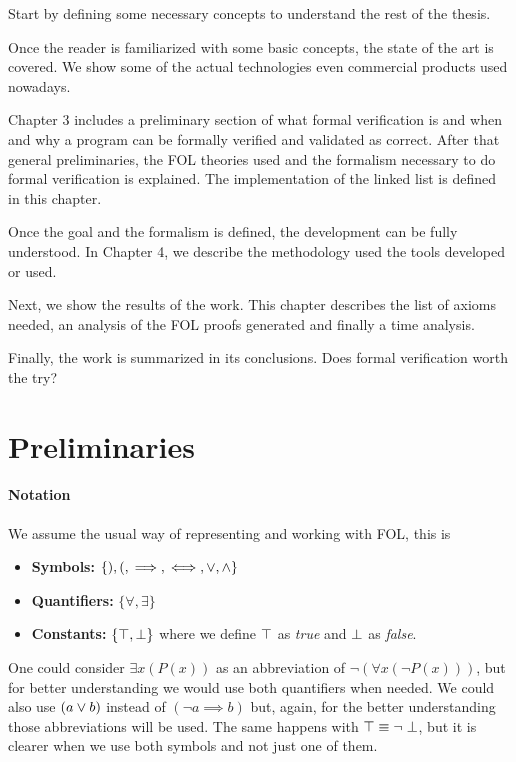 Start by defining some necessary concepts to understand the rest of the thesis.

Once the reader is familiarized with some basic concepts, the state of the art is covered. 
%
We show some of the actual technologies even commercial products used nowadays. 



Chapter 3 includes a preliminary section of what formal verification is and when and why a program can be formally verified and validated as correct. 
% 
After that general preliminaries, the \gls{FOL} theories used and the formalism necessary to do formal verification is explained.
%
The implementation of the linked list is defined in this chapter.

Once the goal and the formalism is defined, the development can be fully understood. 
%
In Chapter 4, we describe the methodology used the tools developed or used.

Next, we show the results of the work. 
%
This chapter describes the list of axioms needed, an analysis of the \gls{FOL} proofs generated and finally a time analysis.

Finally, the work is summarized in its conclusions. 
%
Does formal verification worth the try? 


\section{Preliminaries}


\paragraph{Notation}
\label{def:notation}
We assume the usual way of representing and working with \gls{FOL}, this is
\begin{itemize}
	\item \textbf{Symbols:} $\{),(, \implies, \iff, \vee , \wedge \}$
	\item \textbf{Quantifiers:} $\{\forall, \exists\}$
	\item \textbf{Constants:} $\{\top,\perp\}$
	where we define $\top$ as \textit{true} and $\perp$ as \textit{false}.
\end{itemize}

One could consider $\exists x(P(x))$  as an abbreviation of $\neg (\forall x(\neg P(x)))$, but for better understanding we would use both quantifiers when needed.
We could also use $(a \vee b)$ instead of $(\neg a \implies b)$ but, again, for the better understanding those abbreviations will be used.
The same happens with $\top \equiv \neg \perp$, but it is clearer when we use both symbols and not just one of them.


